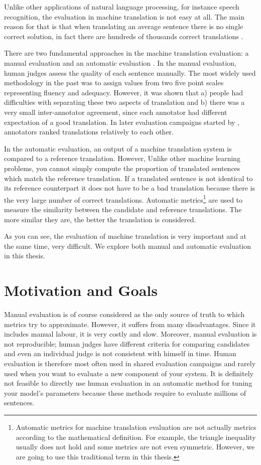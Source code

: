 Unlike other applications of natural language processing, for instance speech
recognition, the evaluation in machine translation is not easy at all. The main
reason for that is that when translating an average sentence there is no single
correct solution, in fact there are hundreds of thousands correct translations
.

There are two fundamental approaches in the machine translation evaluation: a
manual evaluation and an automatic evaluation . In
the manual evaluation, human judges assess the quality of each sentence
manually. The most widely used methodology in the past was to assign values
from two five point scales representing fluency and adequacy. However, it was
shown that a) people had difficulties with separating these two aspects of
translation and b) there was a very small inter-annotator agreement, since each
annotator had different expectation of a good translation. In later evaluation
campaigns started by , annotators ranked
translations relatively to each other.

In the automatic evaluation, an output of a machine translation system is
compared to a reference translation. However, Unlike other machine learning
problems, you cannot simply compute the proportion of translated sentences
which match the reference translation. If a translated sentence is not
identical to its reference counterpart it does not have to be a bad translation
because there is the very large number of correct translations. Automatic
metrics\footnote{Automatic metrics for machine translation evaluation are not
actually metrics according to the mathematical definition. For example, the
triangle inequality usually does not hold and some metrics are not even
symmetric. However, we are going to use this traditional term in this thesis.}
are used to measure the similarity between the candidate and reference
translations. The more similar they are, the better the translation is
considered.

As you can see, the evaluation of machine translation is very important and at
the same time, very difficult. We explore both manual and automatic evaluation
in this thesis.

\section{Motivation and Goals}

Manual evaluation is of course considered as the only source of truth to which
metrics try to approximate. However, it suffers from many disadvantages. Since
it includes manual labour, it is very costly and slow. Moreover, manual
evaluation is not reproducible; human judges have different criteria for
comparing candidates and even an individual judge is not consistent with
himself in time. Human evaluation is therefore most often used in shared
evaluation campaigns and rarely used when you want to evaluate a new component
of your system. It is definitely not feasible to directly use human evaluation
in an automatic method for tuning your model's parameters because these methods
require to evaluate millions of sentences.

